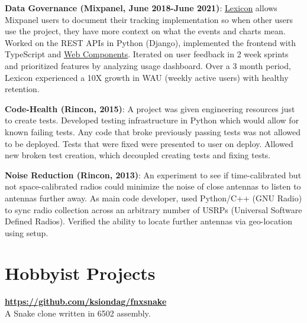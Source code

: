 \documentclass{res}
\begin{document}
\begin{resume}
    {\bf Data Governance (Mixpanel, June 2018-June 2021)}:
    \href{https://help.mixpanel.com/hc/en-us/articles/360001307806-Lexicon-Overview}{Lexicon}
    allows Mixpanel users to document their tracking implementation so when
    other users use the project, they have more context on what the events and
    charts mean. Worked on the REST APIs in Python (Django), implemented the
    frontend with TypeScript and
    \href{https://github.com/mixpanel/panel}{Web Components}. Iterated on user
    feedback in 2 week sprints and prioritized features by analyzing usage
    dashboard. Over a 3 month period, Lexicon experienced a 10X growth in WAU
    (weekly active users) with healthy retention.
  
    {\bf Code-Health (Rincon, 2015)}: A project was given engineering resources
    just to create tests. Developed testing infrastructure in Python which
    would allow for known failing tests. Any code that broke previously passing
    tests was not allowed to be deployed. Tests that were fixed were presented
    to user on deploy. Allowed new broken test creation, which decoupled
    creating tests and fixing tests.
  
    {\bf Noise Reduction (Rincon, 2013)}: An experiment to see if
    time-calibrated but not space-calibrated radios could minimize the noise of
    close antennas to listen to antennas further away. As main code developer,
    used Python/C++ (GNU Radio) to sync radio collection across an arbitrary
    number of USRPs (Universal Software Defined Radios). Verified the ability
    to locate further antennas via geo-location using setup.
  \vspace{0.1in}
  
  
  \section{Hobbyist Projects}
   {\bf \url{https://github.com/ksiondag/fnxsnake}}\\
   A Snake clone written in 6502 assembly.


\end{resume}
\end{document}
